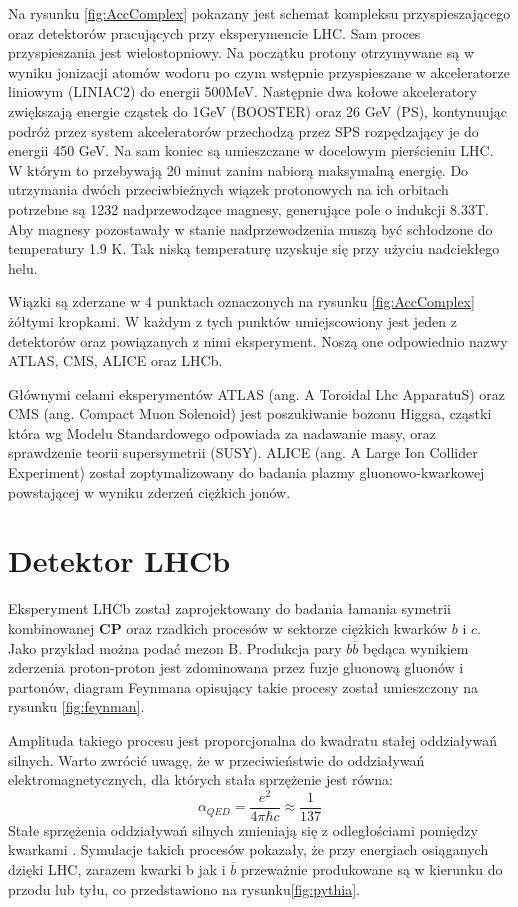 Na rysunku \ref{fig:AccComplex} pokazany jest schemat kompleksu przyspieszającego oraz detektorów pracujących przy eksperymencie LHC. Sam proces przyspieszania jest wielostopniowy\cite{Haefeli}.
Na początku protony otrzymywane są w wyniku jonizacji atomów wodoru po czym wstępnie przyspieszane w akceleratorze liniowym (LINIAC2) do energii 500MeV. Następnie dwa kołowe akceleratory zwiększają energie cząstek do 1GeV (BOOSTER) oraz 26 GeV (PS), kontynuując podróż przez system akceleratorów  przechodzą przez SPS rozpędzający je do energii 450 GeV. Na sam koniec są umieszczane w docelowym pierścieniu LHC. W którym to przebywają 20 minut zanim nabiorą maksymalną energię. Do utrzymania dwóch przeciwbieżnych wiązek protonowych na ich orbitach potrzebne są 1232 nadprzewodzące magnesy, generujące pole o indukcji 8.33T. Aby magnesy pozostawały w stanie nadprzewodzenia muszą być schłodzone do temperatury 1.9 K. Tak niską temperaturę uzyskuje się przy użyciu nadciekłego helu. 

Wiązki są zderzane w 4 punktach oznaczonych na rysunku \ref{fig:AccComplex} żółtymi kropkami. W każdym z tych punktów umiejscowiony jest jeden z detektorów oraz powiązanych z nimi eksperyment. Noszą one odpowiednio nazwy ATLAS, CMS, ALICE oraz LHCb.

Głównymi celami eksperymentów ATLAS (ang. A Toroidal Lhc ApparatuS)\cite{ATLAS} oraz CMS (ang. Compact Muon Solenoid) \cite{CMS} jest poszukiwanie bozonu Higgsa, cząstki która wg Modelu Standardowego odpowiada za nadawanie masy, oraz sprawdzenie teorii supersymetrii (SUSY). ALICE (ang. A Large Ion Collider Experiment)\cite{ALICE} został zoptymalizowany do badania plazmy gluonowo-kwarkowej powstającej w wyniku zderzeń ciężkich jonów.


\section{Detektor LHCb}
Eksperyment LHCb został zaprojektowany do badania łamania symetrii kombinowanej \textbf{CP} oraz rzadkich procesów w sektorze ciężkich kwarków $b$ i $c$. Jako przykład można podać mezon B. Produkcja pary $b\overline{b}$ będąca wynikiem zderzenia proton-proton jest zdominowana przez fuzje gluonową  gluonów i partonów, diagram Feynmana opisujący takie procesy został umieszczony na rysunku \ref{fig:feynman}.

 Amplituda takiego procesu jest proporcjonalna do kwadratu stałej oddziaływań silnych. Warto zwrócić uwagę, że w przeciwieństwie do oddziaływań elektromagnetycznych, dla których stała sprzężenie jest równa:
 \begin{equation}
 \alpha_{QED}=\frac{e^2}{4\pi \hbar c}\approx \frac{1}{137} 
 \end{equation}
Stałe sprzężenia oddziaływań silnych zmieniają się z odległościami pomiędzy kwarkami \cite{perkins}. Symulacje takich procesów pokazały, że przy energiach osiąganych dzięki LHC, zarazem kwarki b jak i  $\overline{b}$ przeważnie produkowane są w kierunku do przodu lub tyłu, co przedstawiono na rysunku\ref{fig:pythia}.  



